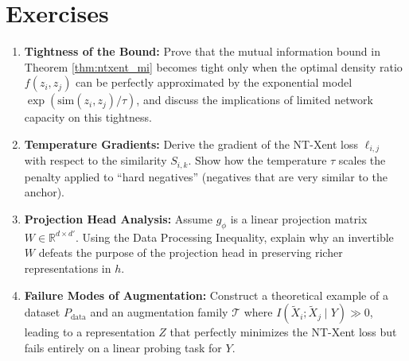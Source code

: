 \section{Exercises}

\begin{enumerate}
    \item \textbf{Tightness of the Bound:} Prove that the mutual information bound in Theorem \ref{thm:ntxent_mi} becomes tight only when the optimal density ratio $f(z_i, z_j)$ can be perfectly approximated by the exponential model $\exp(\text{sim}(z_i, z_j)/\tau)$, and discuss the implications of limited network capacity on this tightness.
    \item \textbf{Temperature Gradients:} Derive the gradient of the NT-Xent loss $\ell_{i,j}$ with respect to the similarity $S_{i,k}$. Show how the temperature $\tau$ scales the penalty applied to ``hard negatives'' (negatives that are very similar to the anchor). 
    \item \textbf{Projection Head Analysis:} Assume $g_\phi$ is a linear projection matrix $W \in \mathbb{R}^{d \times d'}$. Using the Data Processing Inequality, explain why an invertible $W$ defeats the purpose of the projection head in preserving richer representations in $h$.
    \item \textbf{Failure Modes of Augmentation:} Construct a theoretical example of a dataset $P_{\text{data}}$ and an augmentation family $\mathcal{T}$ where $I(\tilde{X}_i; \tilde{X}_j \mid Y) \gg 0$, leading to a representation $Z$ that perfectly minimizes the NT-Xent loss but fails entirely on a linear probing task for $Y$.
\end{enumerate}

